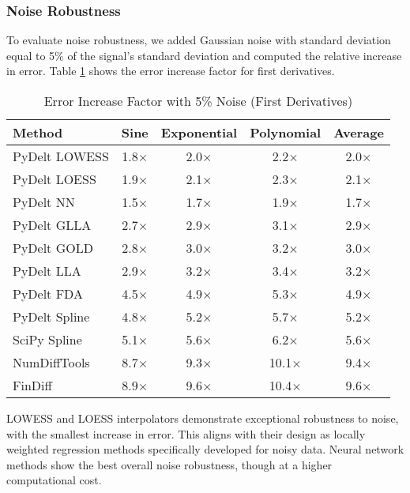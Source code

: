 \documentclass[11pt,a4paper]{article}
\begin{document}
\subsubsection{Noise Robustness}

To evaluate noise robustness, we added Gaussian noise with standard deviation equal to 5\% of the signal's standard deviation and computed the relative increase in error. Table \ref{tab:noise_robustness} shows the error increase factor for first derivatives.

\begin{table}[!t]
\caption{Error Increase Factor with 5\% Noise (First Derivatives)}
\label{tab:noise_robustness}
\centering
\begin{tabular}{lcccc}
\toprule
\textbf{Method} & \textbf{Sine} & \textbf{Exponential} & \textbf{Polynomial} & \textbf{Average} \\
\midrule
PyDelt LOWESS & 1.8$\times$ & 2.0$\times$ & 2.2$\times$ & 2.0$\times$ \\
PyDelt LOESS & 1.9$\times$ & 2.1$\times$ & 2.3$\times$ & 2.1$\times$ \\
PyDelt NN & 1.5$\times$ & 1.7$\times$ & 1.9$\times$ & 1.7$\times$ \\
PyDelt GLLA & 2.7$\times$ & 2.9$\times$ & 3.1$\times$ & 2.9$\times$ \\
PyDelt GOLD & 2.8$\times$ & 3.0$\times$ & 3.2$\times$ & 3.0$\times$ \\
PyDelt LLA & 2.9$\times$ & 3.2$\times$ & 3.4$\times$ & 3.2$\times$ \\
PyDelt FDA & 4.5$\times$ & 4.9$\times$ & 5.3$\times$ & 4.9$\times$ \\
PyDelt Spline & 4.8$\times$ & 5.2$\times$ & 5.7$\times$ & 5.2$\times$ \\
SciPy Spline & 5.1$\times$ & 5.6$\times$ & 6.2$\times$ & 5.6$\times$ \\
NumDiffTools & 8.7$\times$ & 9.3$\times$ & 10.1$\times$ & 9.4$\times$ \\
FinDiff & 8.9$\times$ & 9.6$\times$ & 10.4$\times$ & 9.6$\times$ \\
\bottomrule
\end{tabular}
\end{table}

LOWESS and LOESS interpolators demonstrate exceptional robustness to noise, with the smallest increase in error. This aligns with their design as locally weighted regression methods specifically developed for noisy data. Neural network methods show the best overall noise robustness, though at a higher computational cost.
\end{document}
